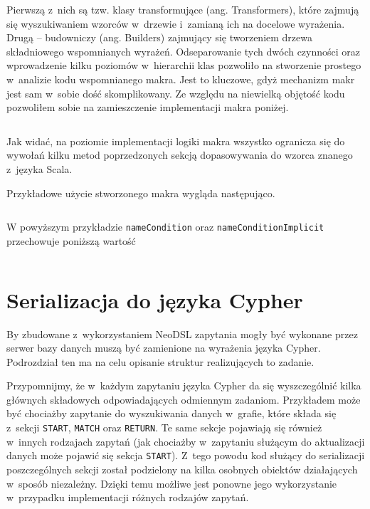 \documentclass[brudnopis]{xmgr}
\begin{document}
Pierwszą z~nich są tzw. klasy transformujące (ang. Transformers), które zajmują się wyszukiwaniem wzorców w~drzewie i~zamianą ich na docelowe wyrażenia. Drugą -- budowniczy (ang. Builders) zajmujący się tworzeniem drzewa składniowego wspomnianych wyrażeń. Odseparowanie tych dwóch czynności oraz wprowadzenie kilku poziomów w~hierarchii klas pozwoliło na stworzenie prostego w~analizie kodu wspomnianego makra. Jest to kluczowe, gdyż mechanizm makr jest sam w~sobie dość skomplikowany.  Ze względu na niewielką objętość kodu pozwoliłem sobie na zamieszczenie implementacji makra poniżej.

\inputminted{scala}{listings/scala/boolean-macro-implementation.scala}

Jak widać, na poziomie implementacji logiki makra wszystko ogranicza się do wywołań kilku metod poprzedzonych sekcją dopasowywania do wzorca znanego z~języka Scala.

\medskip\noindent Przykładowe użycie stworzonego makra wygląda następująco.

\inputminted{scala}{listings/scala/macro-usage.scala}

W powyższym przykładzie \texttt{nameCondition} oraz  \texttt{nameConditionImplicit} przechowuje poniższą wartość

\inputminted{scala}{listings/scala/macro-usage-result.scala}

\section{Serializacja do języka Cypher}

By zbudowane z~wykorzystaniem NeoDSL zapytania mogły być wykonane przez serwer bazy danych muszą być zamienione na wyrażenia języka Cypher. Podrozdział ten ma na celu opisanie struktur realizujących to zadanie. 

Przypomnijmy, że w~każdym zapytaniu języka Cypher da się wyszczególnić kilka głównych składowych odpowiadających odmiennym zadaniom. Przykładem może być chociażby zapytanie do wyszukiwania danych w~grafie, które składa się z~sekcji \texttt{START}, \texttt{MATCH} oraz \texttt{RETURN}. Te same sekcje pojawiają się również w~innych rodzajach zapytań (jak chociażby w~zapytaniu służącym do aktualizacji danych może pojawić się sekcja \texttt{START}). Z~tego powodu kod służący do serializacji poszczególnych sekcji został podzielony na kilka osobnych obiektów działających w~sposób niezależny. Dzięki temu możliwe jest ponowne jego wykorzystanie w~przypadku implementacji różnych rodzajów zapytań.
\end{document}

